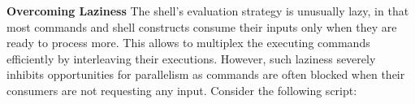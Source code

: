 \documentclass[letterpaper,twocolumn,10pt]{article}
\newcommand{\heading}[1]{\vspace{4pt}\noindent\textbf{#1}\enspace}
\newcommand{\nv}[1]{[{\color{cyan}nv: #1}]}
\newcommand{\kk}[1]{[{\color{magenta}kk: #1}]}
\begin{document}




% 
% 
% 
% 
% 
%




\heading{Overcoming Laziness}
The shell's evaluation strategy is unusually lazy, in that most commands and shell constructs consume their inputs only when they are ready to process more.
This allows \unix to multiplex the executing commands efficiently by interleaving their executions. 
However, such laziness severely inhibits opportunities for parallelism as commands are often blocked when their consumers are not requesting any input.
Consider the following script:
\end{document}
